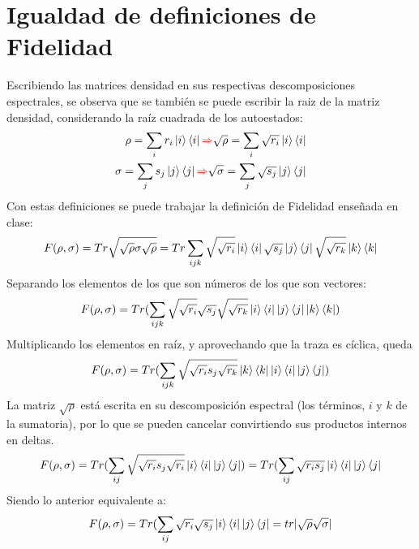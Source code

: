 \documentclass{book}
\begin{document}
\section{{Igualdad de definiciones de Fidelidad}}
Escribiendo las matrices densidad en sus respectivas descomposiciones espectrales, se observa que se también se puede escribir la {raiz de la matriz densidad}, considerando la raíz cuadrada de los autoestados:
\begin{equation}\begin{aligned} {\rho = \sum_i r_i \ket{i} \bra{i}\textcolor{red}{\Rightarrow} \sqrt{\rho} = \sum_i \sqrt{r_i} \ket{i} \bra{i} }\\ { \sigma= \sum_j s_j \ket{j} \bra{j}\textcolor{red}{\Rightarrow}\sqrt{\sigma} = \sum_j \sqrt{s_j} \ket{j} \bra{j}}\end{aligned} \end{equation}
Con estas definiciones se puede trabajar la definición de Fidelidad enseñada en clase:
\begin{equation}{F(\rho,\sigma)=Tr\sqrt{\sqrt{\rho}\sigma\sqrt{\rho}}=Tr\sum_{ijk}\sqrt{\sqrt{r_i}}\ket{i}\bra{i}\sqrt{s_j}\ket{j}\bra{j}\sqrt{\sqrt{r_k}}\ket{k}\bra{k}}\end{equation}
Separando los elementos de los que son números de los que son vectores:
\begin{equation}{F(\rho,\sigma)=Tr(\sum_{ijk}\sqrt{\sqrt{r_i}}\sqrt{s_j}\sqrt{\sqrt{r_k}}\ket{i}\bra{i}\ket{j}\bra{j}\ket{k}\bra{k})}\end{equation}
Multiplicando los elementos en raíz, y aprovechando que la traza es cíclica, queda
\begin{equation}{F(\rho,\sigma)=Tr(\sum_{ijk}\sqrt{\sqrt{r_i}s_j\sqrt{r_k}}\ket{k}\bra{k}\ket{i}\bra{i}\ket{j}\bra{j})}\end{equation}
La matriz ${\sqrt{\rho}}$ está escrita en su descomposición espectral (los términos, ${i}$ y ${k}$ de la sumatoria), por lo que se pueden cancelar convirtiendo sus productos internos en deltas.
\begin{equation}{F(\rho,\sigma)=Tr(\sum_{ij}\sqrt{\sqrt{r_i}s_j\sqrt{r_i}}\ket{i}\bra{i}\ket{j}\bra{j})=Tr(\sum_{ij}\sqrt{r_is_j}\ket{i}\bra{i}\ket{j}\bra{j}}\end{equation}
Siendo lo anterior equivalente a:
\begin{equation}{F(\rho,\sigma)=Tr(\sum_{ij}\sqrt{r_i}\sqrt{s_j}\ket{i}\bra{i}\ket{j}\bra{j}=tr\lvert\sqrt{\rho}\sqrt{\sigma}\rvert}\end{equation}
\end{document}
